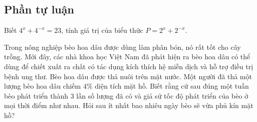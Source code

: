 \subsection{Phần tự luận}

\hienthiloigiaibt
\begin{bt}%
Biết $4^x+4^{-x}=23$, tính giá trị của biểu thức $P=2^x+2^{-x}$.
\end{bt}
\begin{bt}%
Trong nông nghiệp bèo hoa dâu được dùng làm phân bón, nó rất tốt cho cây trồng. Mới đây, các nhà khoa học Việt Nam đã phát hiện ra bèo hoa dâu có thể dùng để chiết xuất ra chất có tác dụng kích thích hệ miễn dịch và hỗ trợ điều trị bệnh ung thư. Bèo hoa dâu được thả nuôi trên mặt nước. Một người đã thả một lượng bèo hoa dâu chiếm $4 \%$ diện tích mặt hồ. Biết rằng cứ sau đúng một tuần bèo phát triển thành 3 lần số lượng đã có và giả sử tốc độ phát triển của bèo ở mọi thời điểm như nhau. Hỏi sau ít nhất bao nhiêu ngày bèo sẽ vừa phủ kín mặt hồ?
\end{bt}
